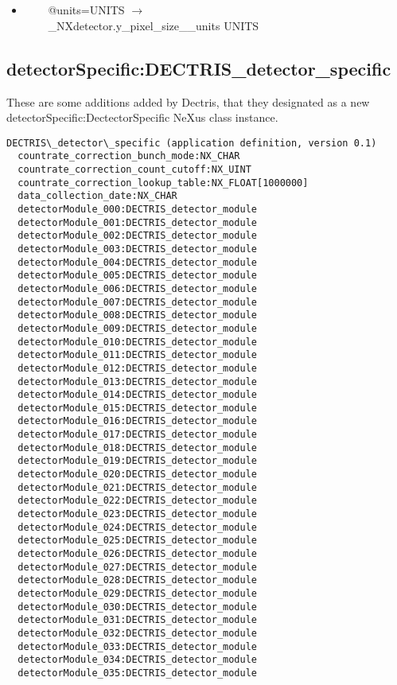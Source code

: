 \documentclass[11pt]{article}
\begin{document}
{{\begin{itemize}
\item{\verb|    |@units=UNITS $\rightarrow$\\
\verb|    |\_NXdetector.y\_pixel\_size\_\_units UNITS}
\end{itemize}


\subsection{detectorSpecific:DECTRIS\_detector\_specific}

These are some additions added by Dectris, that they designated as a new
detectorSpecific:DectectorSpecific NeXus class instance. 

\begin{verbatim}
DECTRIS\_detector\_specific (application definition, version 0.1)
  countrate_correction_bunch_mode:NX_CHAR
  countrate_correction_count_cutoff:NX_UINT
  countrate_correction_lookup_table:NX_FLOAT[1000000]
  data_collection_date:NX_CHAR
  detectorModule_000:DECTRIS_detector_module
  detectorModule_001:DECTRIS_detector_module
  detectorModule_002:DECTRIS_detector_module
  detectorModule_003:DECTRIS_detector_module
  detectorModule_004:DECTRIS_detector_module
  detectorModule_005:DECTRIS_detector_module
  detectorModule_006:DECTRIS_detector_module
  detectorModule_007:DECTRIS_detector_module
  detectorModule_008:DECTRIS_detector_module
  detectorModule_009:DECTRIS_detector_module
  detectorModule_010:DECTRIS_detector_module
  detectorModule_011:DECTRIS_detector_module
  detectorModule_012:DECTRIS_detector_module
  detectorModule_013:DECTRIS_detector_module
  detectorModule_014:DECTRIS_detector_module
  detectorModule_015:DECTRIS_detector_module
  detectorModule_016:DECTRIS_detector_module
  detectorModule_017:DECTRIS_detector_module
  detectorModule_018:DECTRIS_detector_module
  detectorModule_019:DECTRIS_detector_module
  detectorModule_020:DECTRIS_detector_module
  detectorModule_021:DECTRIS_detector_module
  detectorModule_022:DECTRIS_detector_module
  detectorModule_023:DECTRIS_detector_module
  detectorModule_024:DECTRIS_detector_module
  detectorModule_025:DECTRIS_detector_module
  detectorModule_026:DECTRIS_detector_module
  detectorModule_027:DECTRIS_detector_module
  detectorModule_028:DECTRIS_detector_module
  detectorModule_029:DECTRIS_detector_module
  detectorModule_030:DECTRIS_detector_module
  detectorModule_031:DECTRIS_detector_module
  detectorModule_032:DECTRIS_detector_module
  detectorModule_033:DECTRIS_detector_module
  detectorModule_034:DECTRIS_detector_module
  detectorModule_035:DECTRIS_detector_module

\end{verbatim}}}
\end{document}
